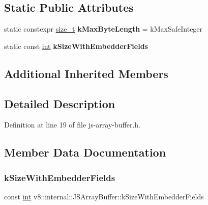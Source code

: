 \subsection*{Static Public Attributes}
\begin{DoxyCompactItemize}
\item 
\mbox{\label{classv8_1_1internal_1_1JSArrayBuffer_aaa9641b33f3b26b38930cbb552f8770c}} 
static constexpr \mbox{\hyperlink{classsize__t}{size\+\_\+t}} {\bfseries k\+Max\+Byte\+Length} = k\+Max\+Safe\+Integer
\item 
static const \mbox{\hyperlink{classint}{int}} {\bfseries k\+Size\+With\+Embedder\+Fields}
\end{DoxyCompactItemize}
\subsection*{Additional Inherited Members}


\subsection{Detailed Description}


Definition at line 19 of file js-\/array-\/buffer.\+h.



\subsection{Member Data Documentation}
\mbox{\label{classv8_1_1internal_1_1JSArrayBuffer_aff1c4adcc51bc0a44208ddf0d40463cb}} 
\subsubsection{\texorpdfstring{k\+Size\+With\+Embedder\+Fields}{kSizeWithEmbedderFields}}
{\footnotesize\ttfamily const \mbox{\hyperlink{classint}{int}} v8\+::internal\+::\+J\+S\+Array\+Buffer\+::k\+Size\+With\+Embedder\+Fields\hspace{0.3cm}{\ttfamily [static]}}

